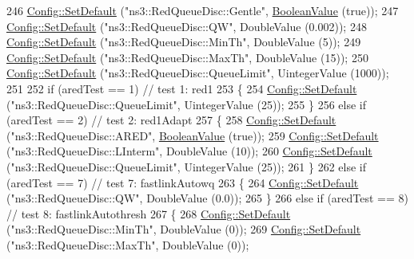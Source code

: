 \begin{DoxyCode}
246   \hyperlink{group__config_ga2e7882df849d8ba4aaad31c934c40c06}{Config::SetDefault} (\textcolor{stringliteral}{"ns3::RedQueueDisc::Gentle"}, 
      \hyperlink{classns3_1_1BooleanValue}{BooleanValue} (\textcolor{keyword}{true}));
247   \hyperlink{group__config_ga2e7882df849d8ba4aaad31c934c40c06}{Config::SetDefault} (\textcolor{stringliteral}{"ns3::RedQueueDisc::QW"}, DoubleValue (0.002));
248   \hyperlink{group__config_ga2e7882df849d8ba4aaad31c934c40c06}{Config::SetDefault} (\textcolor{stringliteral}{"ns3::RedQueueDisc::MinTh"}, DoubleValue (5));
249   \hyperlink{group__config_ga2e7882df849d8ba4aaad31c934c40c06}{Config::SetDefault} (\textcolor{stringliteral}{"ns3::RedQueueDisc::MaxTh"}, DoubleValue (15));
250   \hyperlink{group__config_ga2e7882df849d8ba4aaad31c934c40c06}{Config::SetDefault} (\textcolor{stringliteral}{"ns3::RedQueueDisc::QueueLimit"}, UintegerValue (1000));
251 
252   \textcolor{keywordflow}{if} (aredTest == 1) \textcolor{comment}{// test 1: red1}
253     \{
254       \hyperlink{group__config_ga2e7882df849d8ba4aaad31c934c40c06}{Config::SetDefault} (\textcolor{stringliteral}{"ns3::RedQueueDisc::QueueLimit"}, UintegerValue (25));
255     \}
256   \textcolor{keywordflow}{else} \textcolor{keywordflow}{if} (aredTest == 2) \textcolor{comment}{// test 2: red1Adapt}
257     \{
258       \hyperlink{group__config_ga2e7882df849d8ba4aaad31c934c40c06}{Config::SetDefault} (\textcolor{stringliteral}{"ns3::RedQueueDisc::ARED"}, 
      \hyperlink{classns3_1_1BooleanValue}{BooleanValue} (\textcolor{keyword}{true}));
259       \hyperlink{group__config_ga2e7882df849d8ba4aaad31c934c40c06}{Config::SetDefault} (\textcolor{stringliteral}{"ns3::RedQueueDisc::LInterm"}, DoubleValue (10));
260       \hyperlink{group__config_ga2e7882df849d8ba4aaad31c934c40c06}{Config::SetDefault} (\textcolor{stringliteral}{"ns3::RedQueueDisc::QueueLimit"}, UintegerValue (25));
261     \}
262   \textcolor{keywordflow}{else} \textcolor{keywordflow}{if} (aredTest == 7) \textcolor{comment}{// test 7: fastlinkAutowq}
263     \{
264       \hyperlink{group__config_ga2e7882df849d8ba4aaad31c934c40c06}{Config::SetDefault} (\textcolor{stringliteral}{"ns3::RedQueueDisc::QW"}, DoubleValue (0.0));
265     \}
266   \textcolor{keywordflow}{else} \textcolor{keywordflow}{if} (aredTest == 8) \textcolor{comment}{// test 8: fastlinkAutothresh}
267     \{
268       \hyperlink{group__config_ga2e7882df849d8ba4aaad31c934c40c06}{Config::SetDefault} (\textcolor{stringliteral}{"ns3::RedQueueDisc::MinTh"}, DoubleValue (0));
269       \hyperlink{group__config_ga2e7882df849d8ba4aaad31c934c40c06}{Config::SetDefault} (\textcolor{stringliteral}{"ns3::RedQueueDisc::MaxTh"}, DoubleValue (0));

\end{DoxyCode}
